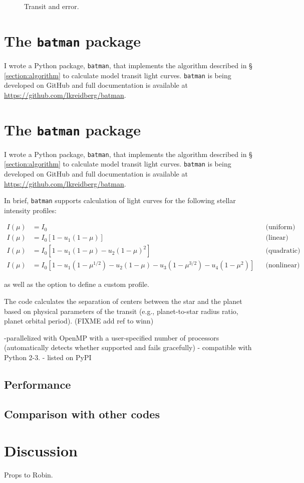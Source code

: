 \documentclass[12pt,preprint]{aastex}
\newcommand*{\blue}{\textcolor{blue}}
\begin{document}
\begin{figure}
\caption{Transit and error.}
\label{fig:transit}
\end{figure}

\section{The \texttt{batman} package}
I wrote a Python package, \texttt{batman}, that implements the algorithm described in \S\,\ref{section:algorithm} to calculate model transit light curves. \texttt{batman} is being developed on GitHub and full documentation is available at \blue{\url{https://github.com/lkreidberg/batman}}.
\section{The \texttt{batman} package}
I wrote a Python package, \texttt{batman}, that implements the algorithm described in \S\,\ref{section:algorithm} to calculate model transit light curves. \texttt{batman} is being developed on GitHub and full documentation is available at \blue{\url{https://github.com/lkreidberg/batman}}.

In brief, \texttt{batman} supports calculation of light curves for the following stellar intensity profiles:

\begin{align}
  I(\mu) &= I_0                                                                         & &\text{(uniform)}             \\
  I(\mu) &= I_0[1 - u_1(1-\mu)]                                                         & &\text{(linear)}              \\
  I(\mu) &= I_0[1 - u_1(1 - \mu) - u_2(1-\mu)^2]                                        & &\text{(quadratic)}           \\
  I(\mu) &= I_0[1 - u_1(1-\mu^{1/2}) - u_2(1- \mu) - u_3(1-\mu^{3/2}) - u_4(1-\mu^2)]   & &\text{(nonlinear)}
\end{align}

as well as the option to define a custom profile.

The code calculates the separation of centers between the star and the planet based on physical parameters of the transit (e.g., planet-to-star radius ratio, planet orbital period). (FIXME add ref to winn)

-parallelized with OpenMP with a user-specified number of processors (automatically detects whether supported and fails gracefully)
- compatible with Python 2-3.
- listed on PyPI


\subsection{Performance}
\subsection{Comparison with other codes}

\section{Discussion}

\acknowledgments
Props to Robin.



\end{document}
